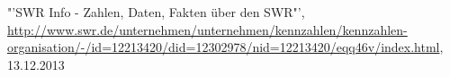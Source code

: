 
\listoffigures

\begin{thebibliography}{xxxxxxxxxxxxxxxxxxx}
 "'SWR Info - Zahlen, Daten, Fakten über den SWR"', \url{http://www.swr.de/unternehmen/unternehmen/kennzahlen/kennzahlen-organisation/-/id=12213420/did=12302978/nid=12213420/eqq46v/index.html}, 13.12.2013
\end{thebibliography}